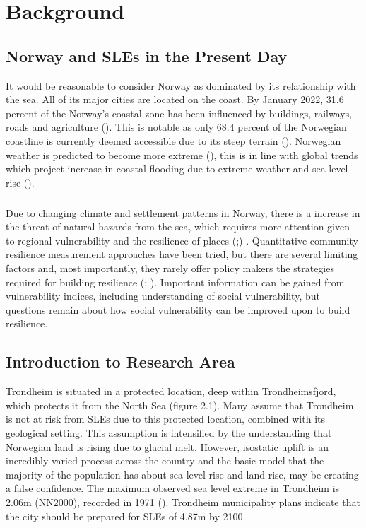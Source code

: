 \chapter{Background}

\section{Norway and SLEs in the Present Day}
 It would be reasonable to consider Norway as dominated by its relationship with the sea. All of its major cities are located on the coast.  By January 2022, 31.6 percent of the Norway's coastal zone has been influenced by buildings, railways, roads and agriculture (\cite{engebakken_construction_2022}). This is notable as only 68.4 percent of the Norwegian coastline is currently deemed accessible due to its steep terrain (\cite{engebakken_construction_2022}). Norwegian weather is predicted to become more extreme (\cite{rod_integrated_2012}), this is in line with global trends which project increase in coastal flooding due to extreme weather and sea level rise (\cite{hoffken_effects_2020}). 
\paragraph{}

Due to changing climate and settlement patterns in Norway, there is a increase in the threat of natural hazards from the sea, which requires more attention given to regional vulnerability and the resilience of places (\cite{opach_seeking_2020};\cite{rod_three_2015}) . Quantitative community resilience measurement approaches have been tried, but there are several limiting factors and, most importantly, they rarely offer policy makers the strategies required for building resilience (\cite{opach_seeking_2020}; \cite{gerkensmeier_governing_2018}). Important information can be gained from vulnerability indices, including understanding of social vulnerability, but questions remain about how social vulnerability can be improved upon to build resilience. 


\section{Introduction to Research Area}

Trondheim is situated in a protected location, deep within Trondheimsfjord, which protects it from the North Sea (figure 2.1). Many assume that Trondheim is not at risk from SLEs due to this protected location, combined with its geological setting. This assumption is intensified by the understanding that Norwegian land is rising due to glacial melt. However, isostatic uplift is an incredibly varied process across the country and the basic model that the majority of the population has about sea level rise and land rise, may be creating a false confidence.  The maximum observed sea level extreme in Trondheim is 2.06m (NN2000), recorded in 1971 (\cite{tides_high_2022}). Trondheim municipality plans indicate that the city should be prepared for SLEs of 4.87m by 2100. 


